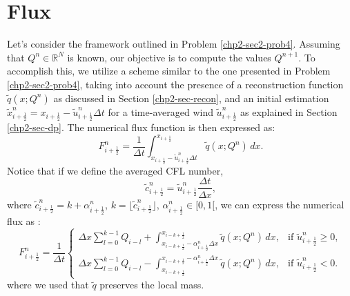 \section{Flux}
\label{chp2-sec-flux}
Let's consider the framework outlined in Problem \ref{chp2-sec2-prob4}.
Assuming that $Q^{n} \in \mathbb{R}^{N}$ is known, our objective is to compute the values $Q^{n+1}$.
To accomplish this, we utilize a scheme similar to the one presented in Problem \ref{chp2-sec2-prob4},
taking into account the presence of a reconstruction function $\tilde{q}(x;Q^n)$ as discussed in Section
\ref{chp2-sec-recon}, and an initial estimation
$\tilde{x}_{i+\frac{1}{2}}^n = {x}_{i+\frac{1}{2}} -\tilde{u}_{i+\frac{1}{2}}^n \Delta t$
for a time-averaged wind $\tilde{u}_{i+\frac{1}{2}}^n$ as explained in Section \ref{chp2-sec-dp}.
The numerical flux function is then expressed as:
\begin{equation}
	\label{chp-sec-flux:numerical-flux1}
	F^{n}_{i+\frac{1}{2}} = \frac{1}{\Delta t}
	\int_{x_{i+\frac{1}{2}}-\tilde{u}^n_{i+\frac{1}{2}}\Delta t}^{x_{i+\frac{1}{2}}}
	\tilde{q}(x;Q^n) \,dx.
\end{equation}
Notice that if we define the averaged CFL number,
\begin{equation*}
	\label{chp-sec-flux:cedges}
	\tilde{c}_{i+\frac{1}{2}}^n = \tilde{u}_{i+\frac{1}{2}}^n\frac{\Delta t}{\Delta x},
\end{equation*}
where $\tilde{c}_{i+\frac{1}{2}}^n = k + \alpha_{i+\frac{1}{2}}^n$, $k = \lfloor \tilde{c}_{i+\frac{1}{2}}^n \rfloor$,
$\alpha_{i+\frac{1}{2}}^n \in [0,1[$,
we can express the numerical flux as \citep{lin:1996, chen:2017}:
\begin{equation}
	\label{chp-sec-flux:numerical-flux}
	F_{i+\frac{1}{2}}^n =  \frac{1}{\Delta t}
	\begin{cases}
	\Delta x\sum_{l=0}^{k-1} Q_{i-l} +  
    \int_{x_{i-k+\frac{1}{2}}-{\alpha}^n_{i+\frac{1}{2}}\Delta x}^{x_{i-k+\frac{1}{2}}}
    \tilde{q}(x;Q^n) \,dx, & \text{if } \tilde{u}_{i+\frac{1}{2}}^n \geq 0,\\
	\Delta x\sum_{l=0}^{k-1} Q_{i-l} -  
    \int^{x_{i-k+\frac{1}{2}}-{\alpha}^n_{i+\frac{1}{2}}\Delta x}_{x_{i-k+\frac{1}{2}}}
    \tilde{q}(x;Q^n) \,dx, & \text{if } \tilde{u}_{i+\frac{1}{2}}^n < 0.
	\end{cases}
\end{equation}
where we used that $\tilde{q}$ preserves the local mass.

